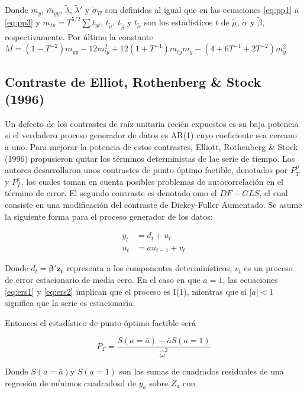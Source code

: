 \documentclass[12pt, twoside]{book}\usepackage[]{graphicx}\usepackage[]{color}
\numberwithin{equation}{section}
\numberwithin{theorem}{section}
\numberwithin{teorema}{section}
\numberwithin{defi}{section}
\numberwithin{prop}{section}
\numberwithin{defi}{section}
\theoremstyle{plain}
\begin{document}
Donde $m_{y}$, $\bar{m}_{yy}$, $\tilde{\lambda}$, $\tilde{\lambda}'$ y $\tilde{\sigma}_{Tl}$ son definidos al igual que en las ecuaciones \ref{eq:pp1} a \ref{eq:pp3} y $m_{ty}=T^{5/2}\sum t_{yt}$, $t_{\tilde{\mu}}$, $t_{\tilde{\beta}}$ y $t_{\tilde{\alpha}}$ son los estadísticos $t$ de $\tilde{\mu}$, $\tilde{\alpha}$ y $\tilde{\beta}$, respectivamente. Por último la constante $M=(1-T^{-2})m_{yy}-12m^{2}_{ty}+12(1+T^{-1})m_{ty}m_{y}-(4+6T^{-1}+2T^{-2})m_{y}^{2}$

\subsection{Contraste de Elliot, Rothenberg \& Stock (1996)} 

Un defecto de los contrastes de raíz unitaria recién expuestos es su baja potencia si el verdadero proceso generador de datos es AR(1) cuyo coeficiente sea cercano a uno. Para mejorar la potencia de estos contrastes, Elliott, Rothenberg \& Stock (1996) propusieron quitar los términos deterministas de lae  serie de tiempo. Los autores desarrollaron unos contrastes de punto-óptimo factible, denotados por $P^{\mu}_{T}$ y $P^{\tau}_{T}$, los cuales toman en cuenta posibles problemas de autocorrelación en el término de error. El segundo contraste es denotado omo el $DF-GLS$, el cual consiste en una modificación del contraste de Dickey-Fuller Aumentado. Se asume la siguiente forma para el proceso generador de los datos: 

\begin{align}
y_{t} & = d_{t}+u_{t} \label{eq:ers1}\\ 
u_{t} & = a u_{t-1}+v_{t} \label{eq:ers2}
\end{align}

Donde $d_{t}=\boldsymbol{\beta' z_{t}}$ representa a los componentes determinísticos, $v_{t}$ es un proceso de error estacionario de media cero. En el caso en que $a=1$, las ecuaciones  \ref{eq:ers1} y \ref{eq:ers2} implican que el proceso es I(1), mientras que si $|a|<1$ significa que la serie es estacionaria. 

Entonces el estadístico de punto óptimo factible será 

\begin{equation}
P_{T} = \frac{S(a=\bar{a})-\bar{a}S(a=1)}{\hat{\omega}^{2}}
\end{equation}

Donde $S(a=\bar{a})$y $S(a=1)$ son las sumas de cuadrados residuales de una regresión de mínimos cuadradosd de $y_{a}$ sobre $Z_{a}$ con 
\end{document}
